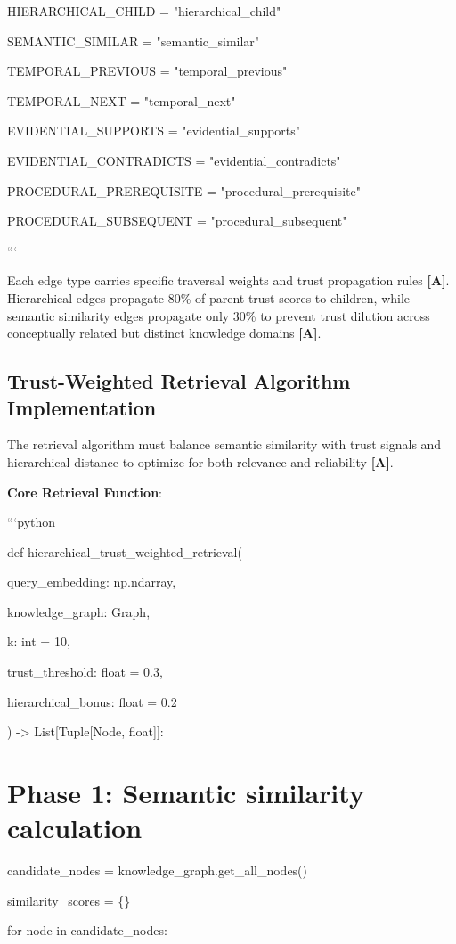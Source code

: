 \documentclass[a4paper,11pt]{article}
\newcommand{\alabel}{\textbf{\textcolor{acolor}{[A]}}}
\begin{document}
HIERARCHICAL\_CHILD = "hierarchical\_child"

SEMANTIC\_SIMILAR = "semantic\_similar"

TEMPORAL\_PREVIOUS = "temporal\_previous"

TEMPORAL\_NEXT = "temporal\_next"

EVIDENTIAL\_SUPPORTS = "evidential\_supports"

EVIDENTIAL\_CONTRADICTS = "evidential\_contradicts"

PROCEDURAL\_PREREQUISITE = "procedural\_prerequisite"

PROCEDURAL\_SUBSEQUENT = "procedural\_subsequent"

```


Each edge type carries specific traversal weights and trust propagation rules \alabel{}. Hierarchical edges propagate 80\% of parent trust scores to children, while semantic similarity edges propagate only 30\% to prevent trust dilution across conceptually related but distinct knowledge domains \alabel{}.


\subsection{Trust-Weighted Retrieval Algorithm Implementation}

The retrieval algorithm must balance semantic similarity with trust signals and hierarchical distance to optimize for both relevance and reliability \alabel{}.


\textbf{Core Retrieval Function}:

```python

def hierarchical\_trust\_weighted\_retrieval(

query\_embedding: np.ndarray,

knowledge\_graph: Graph,

k: int = 10,

trust\_threshold: float = 0.3,

hierarchical\_bonus: float = 0.2

) -> List[Tuple[Node, float]]:


\section{Phase 1: Semantic similarity calculation}
candidate\_nodes = knowledge\_graph.get\_all\_nodes()

similarity\_scores = \{\}


for node in candidate\_nodes:
\end{document}
